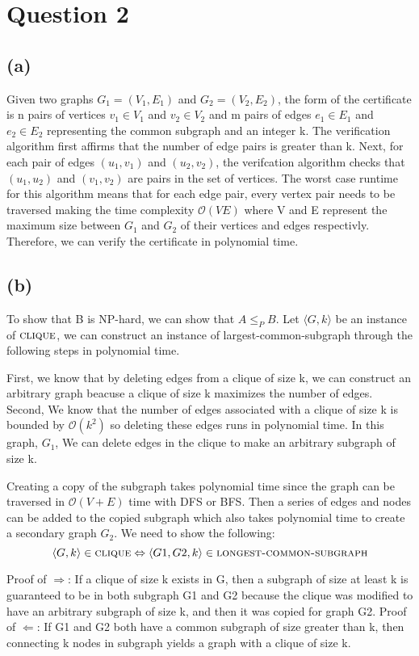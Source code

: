 \section{Question 2}
\subsection{(a)}
Given two graphs $G_1 = (V_1, E_1)$ and $G_2 = (V_2, E_2)$, the form of the certificate is 
n pairs of vertices $v_1 \in V_1$ and $v_2 \in V_2$ and m pairs of edges $e_1 \in E_1$ and $e_2 \in E_2$ representing the common subgraph and an integer k.
The verification algorithm first affirms that the number of edge pairs is greater than k.
Next, for each pair of edges $(u_1, v_1)$ and $(u_2, v_2)$, the verifcation algorithm checks that $(u_1, u_2)$ and $(v_1, v_2)$ are pairs in the set of vertices.
The worst case runtime for this algorithm means that for each edge pair, every vertex pair needs to be traversed making the time complexity $\mathcal{O}(VE)$
where V and E represent the maximum size between $G_1$ and $G_2$ of their vertices and edges respectivly.
Therefore, we can verify the certificate in polynomial time.
\subsection{(b)}
To show that B is NP-hard, we can show that $A \leq_P B$. 
Let $\langle G, k \rangle$ be an instance of $\textsc{clique}$,
we can construct an instance of largest-common-subgraph through
the following steps in polynomial time. 

First, we know that by deleting edges from a clique of size k, 
we can construct an arbitrary graph beacuse a clique of size k maximizes
the number of edges. Second, We know that the number of
edges associated with a clique of size k is bounded by $\mathcal{O}(k^2)$
so deleting these edges runs in polynomial time. In this graph, $G_1$, 
We can delete edges in the clique to make an arbitrary subgraph of size k.

Creating a copy of the subgraph takes polynomial time since the graph can be 
traversed in  $\mathcal{O}(V + E)$ time with DFS or BFS. Then a series of edges and nodes
can be added to the copied subgraph which also takes polynomial time to create a secondary 
graph $G_2$. We need to show the following:
\[\langle G, k \rangle \in \textsc{clique} \Leftrightarrow \langle G1, G2, k \rangle \in \textsc{longest-common-subgraph}\]

Proof of $\Rightarrow$:
If a clique of size k exists in G, then a subgraph of size at least k is guaranteed to be 
in both subgraph G1 and G2 because the clique was modified to have an arbitrary subgraph of size k, 
and then it was copied for graph G2. 
Proof of $\Leftarrow$:
If G1 and G2 both have a common subgraph of size greater than k, then connecting k nodes in subgraph
yields a graph with a clique of size k.